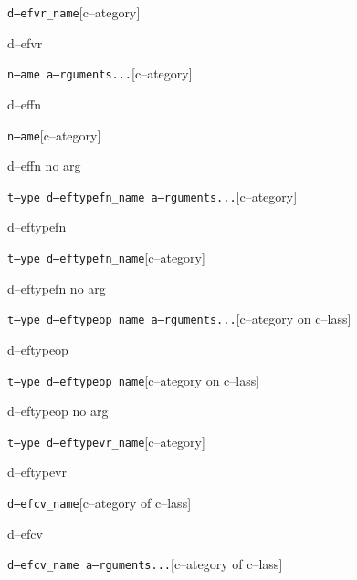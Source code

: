 \documentclass{book}
\begin{document}
\noindent\texttt\bgroup{}d--efvr\_name\egroup{}\hfill[c--ategory]



%
d--efvr

\noindent\texttt\bgroup{}n--ame a--rguments...\egroup{}\hfill[c--ategory]



%
d--effn

\noindent\texttt\bgroup{}n--ame\egroup{}\hfill[c--ategory]



%
d--effn no arg

\noindent\texttt\bgroup{}t--ype d--eftypefn\_name a--rguments...\egroup{}\hfill[c--ategory]



%
d--eftypefn

\noindent\texttt\bgroup{}t--ype d--eftypefn\_name\egroup{}\hfill[c--ategory]



%
d--eftypefn no arg

\noindent\texttt\bgroup{}t--ype d--eftypeop\_name a--rguments...\egroup{}\hfill[c--ategory on c--lass]



%
d--eftypeop

\noindent\texttt\bgroup{}t--ype d--eftypeop\_name\egroup{}\hfill[c--ategory on c--lass]



%
d--eftypeop no arg

\noindent\texttt\bgroup{}t--ype d--eftypevr\_name\egroup{}\hfill[c--ategory]



%
d--eftypevr

\noindent\texttt\bgroup{}d--efcv\_name\egroup{}\hfill[c--ategory of c--lass]



%
d--efcv

\noindent\texttt\bgroup{}d--efcv\_name a--rguments...\egroup{}\hfill[c--ategory of c--lass]
\end{document}
